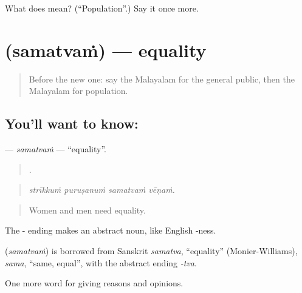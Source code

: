\begin{tcolorbox}[breakable,colback=teal!4,colframe=teal!35!black,title={Before you move on}]
What does  mean? (\textquotedblleft{}Population\textquotedblright{}.) Say it once more.
\end{tcolorbox}
\section[\texorpdfstring{\ml{സമത്വം} (samatvaṁ)}{സമത്വം (samatvaṁ)}]{ (samatvaṁ) — equality}

\label{lesson:ML-C415-samatvam}



\begin{quote}
Before the new one: say the Malayalam for the general public, then the Malayalam for population.
\end{quote}

\subsection*{You'll want to know: }
\textbf{} — \emph{samatvaṁ} — \textquotedblleft{}equality\textquotedblright{}.

\begin{quote}
   .
\end{quote}

\begin{quote}
\emph{strīkkuṁ puruṣanuṁ samatvaṁ vēṇaṁ.}
\end{quote}

\begin{quote}
Women and men need equality.
\end{quote}

The - ending makes an abstract noun, like English -ness.

\begin{cousinweb}
\textbf{} (\emph{samatvaṁ}) is borrowed from Sanskrit \emph{samatva}, \textquotedblleft{}equality\textquotedblright{} (Monier-Williams), \emph{sama}, \textquotedblleft{}same, equal\textquotedblright{}, with the abstract ending \emph{-tva}.
\end{cousinweb}

\begin{grammarlens}[title={What you've built}]
One more word for giving reasons and opinions.
\end{grammarlens}

